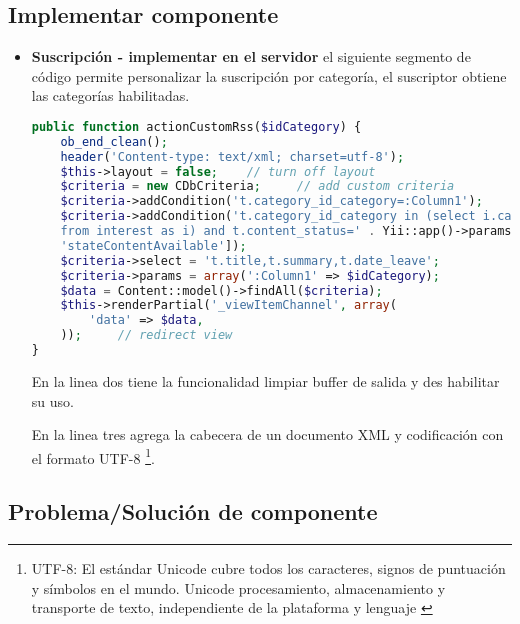 \subsection{Implementar componente}

\begin{itemize}

\item \textbf{Suscripción - implementar en el servidor} el
siguiente segmento de código permite personalizar la suscripción por
categoría, el suscriptor obtiene las categorías habilitadas. 

\begin{lstlisting}[language=PHP, caption={Personalización de suscriptor.}]
public function actionCustomRss($idCategory) {
    ob_end_clean();
    header('Content-type: text/xml; charset=utf-8');
    $this->layout = false;    // turn off layout
    $criteria = new CDbCriteria;     // add custom criteria
    $criteria->addCondition('t.category_id_category=:Column1');
    $criteria->addCondition('t.category_id_category in (select i.category_id_category
    from interest as i) and t.content_status=' . Yii::app()->params[
    'stateContentAvailable']);
    $criteria->select = 't.title,t.summary,t.date_leave';
    $criteria->params = array(':Column1' => $idCategory);
    $data = Content::model()->findAll($criteria);
    $this->renderPartial('_viewItemChannel', array(
        'data' => $data,
    ));     // redirect view
}
\end{lstlisting}

En la linea dos tiene la funcionalidad limpiar buffer de salida y
des habilitar su uso.

En la linea tres agrega la cabecera de un documento XML y codificación con
el formato UTF-8 \footnote{UTF-8: El estándar Unicode cubre todos
los caracteres, signos de puntuación y símbolos en el mundo. Unicode 
procesamiento, almacenamiento y transporte de texto, independiente de la 
plataforma y lenguaje \cite{utf8}}.

\end{itemize}

\subsection{Problema/Solución de componente}

